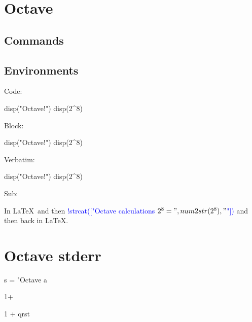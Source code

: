 \documentclass[11pt]{article}
\begin{document}
\section*{Octave}

\subsection*{Commands}




\printpythontex




\subsection*{Environments}

Code:
\begin{octavecode}
disp("Octave!")
disp(2^8)
\end{octavecode}

Block:
\begin{octaveblock}
disp("Octave!")
disp(2^8)
\end{octaveblock}

\printpythontex

Verbatim:
\begin{octaveverbatim}
disp("Octave!")
disp(2^8)
\end{octaveverbatim}

Sub:
\begin{octavesub}
In \LaTeX\ and then \textcolor{blue}{!{strcat(["Octave calculations $2^8=", num2str(2^8), "$"])}} and then back in \LaTeX.
\end{octavesub}



\section*{Octave stderr}


\begin{octaveblock}[err1][numbers=left]
s = "Octave a
\end{octaveblock}

\stderrpythontex

\begin{octaveblock}[err2][numbers=left]
1+
\end{octaveblock}

\stderrpythontex

\begin{octaveblock}[err3][numbers=left]
1 + qrst
\end{octaveblock}

\stderrpythontex
\end{document}
